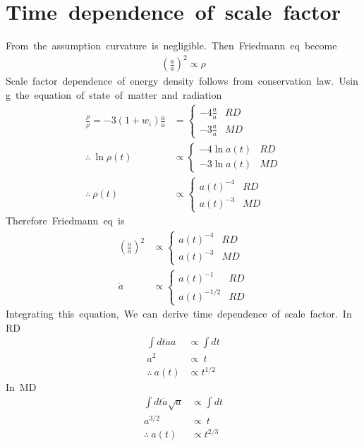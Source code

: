 \section{Time\ dependence\ of\ scale\ factor}
From\ the\ assumption\ curvature\ is\ negligible.\ Then\ Friedmann\ eq\ become
\begin{align*}
    \left(\frac{\Dot{a}}{a}\right)^2\propto\rho
\end{align*}
Scale\ factor\ dependence\ of\ energy\ density\ follows\ from\ conservation\ law.\ Using\ the\ equation\ of\ state\ of\ matter\ and\ radiation
\begin{align*}
    \frac{\Dot{\rho}}{\rho}=-3(1+w_i)\frac{\Dot{a}}{a}&=\begin{cases}
        -4\frac{\Dot{a}}{a}&RD\\
        -3\frac{\Dot{a}}{a}&MD
    \end{cases}\\
    \therefore\ \ln{\rho(t)}&\propto\begin{cases}
        -4\ln{a(t)}&RD\\
        -3\ln{a(t)}&MD
    \end{cases}\\
    \therefore\ \rho(t)&\propto\begin{cases}
        a(t)^{-4}&RD\\
        a(t)^{-3}&MD
    \end{cases}
\end{align*}
Therefore\ Friedmann\ eq\ is
\begin{align*}
    \left(\frac{\Dot{a}}{a}\right)^2&\propto\begin{cases}
        a(t)^{-4}&RD\\
        a(t)^{-3}&MD
    \end{cases}\\
    \Dot{a}&\propto\begin{cases}
        a(t)^{-1}&RD\\
        a(t)^{-1/2}&RD
    \end{cases}
\end{align*}
Integrating\ this\ equation,\ We\ can\ derive\ time\ dependence\ of\ scale\ factor.\ In\ RD
\begin{align}
    \int dt\Dot{a}a&\propto\int dt\nonumber\\
    a^2&\propto\ t\nonumber\\
    \therefore\ a(t)&\propto t^{1/2}
\end{align}
In\ MD
\begin{align}
    \int dt\Dot{a}\sqrt{a}&\propto\int dt\nonumber\\
    a^{3/2}&\propto\ t\nonumber\\
    \therefore\ a(t)&\propto t^{2/3}
\end{align}

